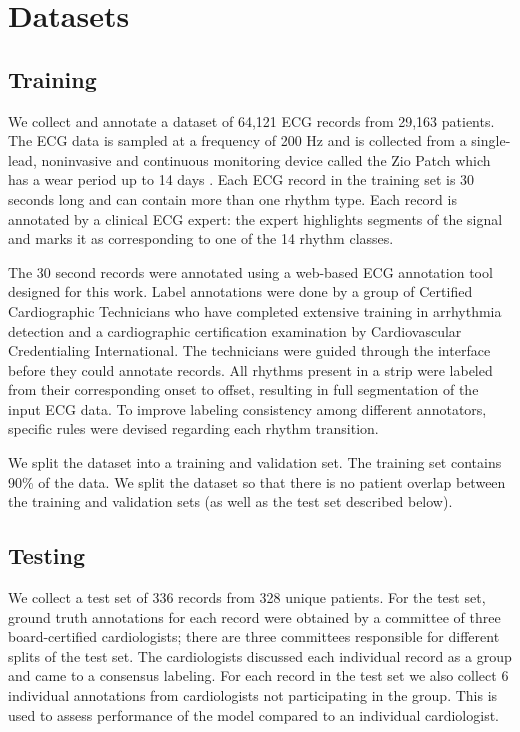 \section{Datasets}
\label{arrhythmia:sec:data}

\subsection*{Training}
We collect and annotate a dataset of 64,121 ECG records from 29,163 patients.
The ECG data is sampled at a frequency of 200 Hz and is collected from a
single-lead, noninvasive and  continuous monitoring device called the Zio Patch
which has a wear period up to 14 days \cite{turakhia2013diagnostic}. Each ECG
record in the training set is 30 seconds long and can contain more than one
rhythm type. Each record is annotated by a clinical ECG expert: the expert
highlights segments of the signal and marks it as corresponding to one of the
14 rhythm classes.

The 30 second records were annotated using a web-based ECG annotation tool
designed for this work. Label annotations were done by a group of Certified
Cardiographic Technicians who have completed extensive training in arrhythmia
detection and a cardiographic certification examination by Cardiovascular
Credentialing International. The technicians were guided through the interface
before they could annotate records. All rhythms present in a strip were labeled
from their corresponding onset to offset, resulting in full segmentation of the
input ECG data. To improve labeling consistency among different annotators,
specific rules were devised regarding each rhythm transition.

We split the dataset into a training and validation set. The training set
contains 90\% of the data. We split the dataset so that there is no patient
overlap between the training and validation sets (as well as the test set
described below).

\subsection*{Testing}

We collect a test set of 336 records from 328 unique patients. For the test
set, ground truth annotations for each record were obtained by a committee of
three board-certified cardiologists; there are three committees responsible for
different splits of the test set. The cardiologists discussed each individual
record as a group and came to a consensus labeling. For each record in the test
set we also collect 6 individual annotations from cardiologists not
participating in the group. This is used to assess performance of the model
compared to an individual cardiologist.

